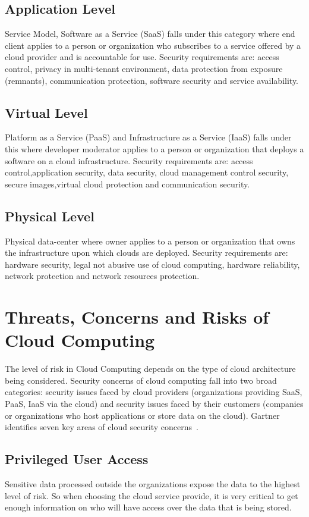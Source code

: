 \subsection{Application Level} 
Service Model, Software as a Service (SaaS) falls under this category 
where end client applies to a person or organization who subscribes
to a service offered by a cloud provider and is accountable for use. 
Security requirements are: access control, privacy in multi-tenant 
environment, data protection from exposure (remnants), 
communication protection, software security and service availability.

\subsection{Virtual Level}
Platform as a Service (PaaS) and Infrastructure as a Service (IaaS) falls 
under this where developer moderator applies to a person or organization 
that deploys a software on a cloud infrastructure. 
Security requirements are: access control,application security, data security,
cloud management control security, secure images,virtual cloud protection 
and communication security.

\subsection{Physical Level}
Physical data-center where owner applies to a person or organization 
that owns the infrastructure upon which clouds are deployed. 
Security requirements are: hardware security, legal not abusive 
use of cloud computing, hardware reliability, network protection 
and network resources protection.

\section{Threats, Concerns and Risks of Cloud Computing}
The level of risk in Cloud Computing depends on the type of cloud 
architecture being considered. Security concerns of cloud computing 
fall into two broad categories: security issues faced by cloud providers 
(organizations providing SaaS, PaaS, IaaS via the cloud) and 
security issues faced by their customers (companies or organizations who 
host applications or store data on the cloud). Gartner identifies seven key
areas of cloud security concerns~\cite{hid-sp18-513-gartner}.

\subsection{Privileged User Access}
Sensitive data processed outside the organizations expose the data to the
highest level of risk. So when choosing the cloud service provide, it is
very critical to get enough information on who will have access over the data
that is being stored.

